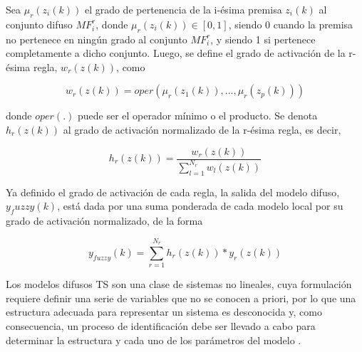 \documentclass[12pt]{article}
\begin{document}
Sea $\mu_r(z_i(k))$ el grado de pertenencia de la i-ésima premisa $z_i(k)$  al conjunto difuso
$MF_i^r$, donde $\mu_r(z_i(k))\in[0,1]$, siendo 0 cuando la premisa no pertenece en ningún grado
al conjunto $MF_i^r$, y siendo 1 si pertenece completamente a dicho conjunto. Luego, se
define el grado de activación de la r-ésima regla, $w_r(z(k))$, como

\begin{equation}
w_r(z(k))=oper(\mu_r(z_1(k)),...,\mu_r(z_p(k)))
\label{e_Act}
\end{equation}

donde $oper(.)$ puede ser el operador mínimo o el producto. Se denota $h_r(z(k))$ al grado
de activación normalizado de la r-ésima regla, es decir,

\begin{equation}
h_r(z(k))=\frac{w_r(z(k))}{\sum_{l=1}^{N_r}w_l(z(k))}
\label{e_ActNor}
\end{equation}

Ya definido el grado de activación de cada regla, la salida del modelo difuso,
$y_fuzzy(k)$, está dada por una suma ponderada de cada modelo local por su grado de
activación normalizado, de la forma

\begin{equation}
y_{fuzzy}(k)=\sum_{r=1}^{N_r}h_r(z(k))*y_r(z(k))
\label{e_ModDifuso}
\end{equation}

Los modelos difusos TS son una clase de sistemas no
lineales, cuya formulación requiere definir una serie de variables que no se conocen a
priori, por lo que una estructura adecuada para representar un sistema es desconocida y,
como consecuencia, un proceso de identificación debe ser llevado a cabo para
determinar la estructura y cada uno de los parámetros del modelo \citep{alvarez_metodologiidentificacion_nodate}.
\end{document}
